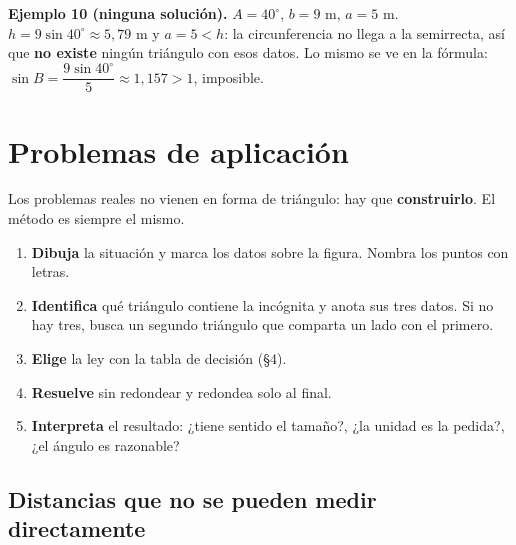 \documentclass[12pt, letterpaper]{article}
\providecommand{\sen}{\sin}
\begin{document}
\begin{cuadrosolucion}
  \small
  \textbf{Ejemplo 10 (ninguna solución).} $A=40^{\circ}$, $b=9$ m, $a=5$ m.
  \\[2pt]
  $h=9\sen 40^{\circ}\approx 5{,}79$ m y $a=5<h$: la circunferencia no llega
  a la semirrecta, así que \textbf{no existe} ningún triángulo con esos
  datos. Lo mismo se ve en la fórmula:
  $\sen B=\dfrac{9\sen 40^{\circ}}{5}\approx 1{,}157>1$, imposible.
\end{cuadrosolucion}

\clearpage
\section{Problemas de aplicación}

Los problemas reales no vienen en forma de triángulo: hay que
\textbf{construirlo}. El método es siempre el mismo.

\begin{cuadropasos}
  \small
  \begin{enumerate}[leftmargin=1.4em, nosep]
    \item \textbf{Dibuja} la situación y marca los datos sobre la figura.
          Nombra los puntos con letras.
    \item \textbf{Identifica} qué triángulo contiene la incógnita y anota sus
          tres datos. Si no hay tres, busca un segundo triángulo que comparta
          un lado con el primero.
    \item \textbf{Elige} la ley con la tabla de decisión (§4).
    \item \textbf{Resuelve} sin redondear y redondea solo al final.
    \item \textbf{Interpreta} el resultado: ¿tiene sentido el tamaño?, ¿la
          unidad es la pedida?, ¿el ángulo es razonable?
  \end{enumerate}
\end{cuadropasos}

\subsection*{Distancias que no se pueden medir directamente}
\end{document}
